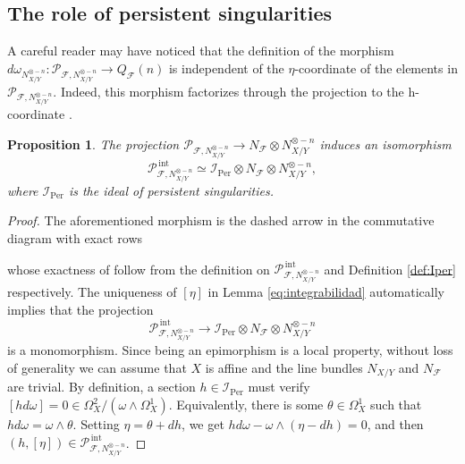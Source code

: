 \documentclass[reqno]{amsart}
\theoremstyle{plain}
\newcommand{\I}{\mathcal{I}}
\renewcommand{\I}{\mathcal{I}}
\newcommand{\F}{\mathscr{F}}
\newcommand{\PP}{\mathcal{P}}
\DeclareMathOperator{\Per}{Per}
\DeclareMathOperator{\Int}{int}
\newtheorem{proposition}[theorem]{Proposition}
\theoremstyle{definition}
\theoremstyle{named}
\begin{document}
\subsection{The role of persistent singularities}

 A careful reader may have noticed that the definition of the morphism $d\omega_{N_{X/Y}^{\otimes - n}}: \PP_{\F,N_{X/Y}^{\otimes - n}} \to  Q_{\F}(n) $ is independent of the $\eta$-coordinate of the elements in $\PP_{\F,N_{X/Y}^{\otimes - n}}$. Indeed, this morphism factorizes through the projection to the h-coordinate \smash{$\PP_{\F,N_{X/Y}^{\otimes - n}}\to N_\F\otimes N_{X/Y}^{\otimes - n}$}.

 \begin{proposition}\label{pint=per} The projection $\PP_{\F,N_{X/Y}^{\otimes - n}} \to N_\F\otimes N_{X/Y}^{\otimes - n}$ induces an isomorphism 
 $$\PP_{\F,N_{X/Y}^{\otimes - n}}^{\,\Int}\simeq \I_{\Per} \otimes N_\F\otimes N_{X/Y}^{\otimes - n},$$
    where $\I_{\Per}$ is the ideal of persistent singularities.  
 \end{proposition}
\begin{proof}
The aforementioned morphism is the dashed arrow in the commutative diagram with exact rows
\begin{center}
\end{center}
whose exactness of follow from the definition on $\PP_{\F,N_{X/Y}^{\otimes - n}}^{\,\Int}$ and Definition \ref{def:Iper} respectively.
The uniqueness of $[\eta]$ in Lemma \ref{eq:integrabilidad} automatically implies that the projection $$\PP_{\F,N_{X/Y}^{\otimes - n}}^{\,\Int}\to \I_{\Per} \otimes N_\F\otimes N_{X/Y}^{\otimes - n}$$
is a monomorphism. Since being an epimorphism is a local property, without loss of generality we can assume that $X$ is affine and the line bundles $N_{X/Y}$ and $N_\F$ are trivial. By definition, a section $h\in \I_{\Per}$ must verify $[hd\omega] = 0\in \Omega^2_{X}/(\omega\wedge\Omega^1_X)$. Equivalently, there is some $\theta\in \Omega^1_X$ such that $hd\omega=\omega\wedge\theta$. Setting $\eta=\theta+dh$, we get $hd\omega - \omega\wedge(\eta - dh) = 0$, and then $(h,[\eta])\in\PP_{\F,N_{X/Y}^{\otimes - n}}^{\,\Int}$.
\end{proof}
\end{document}
